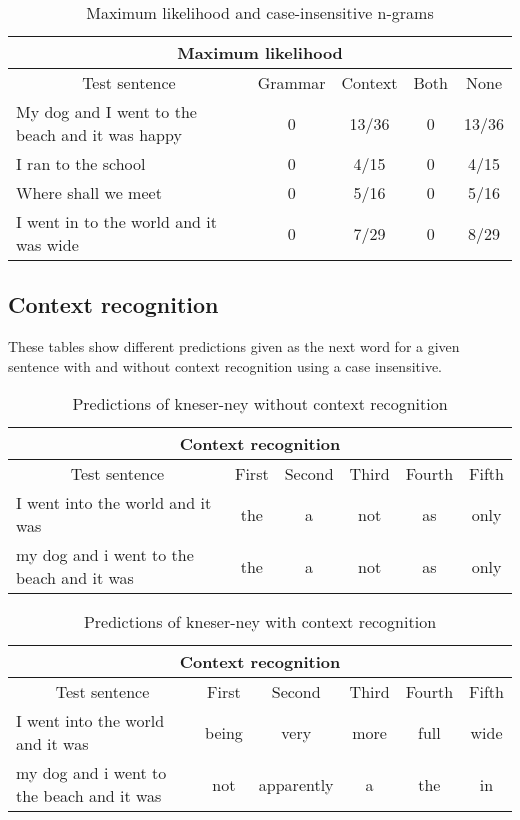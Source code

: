 \vspace{-1cm}
\begin{table}[H]
\centering
\caption{Maximum likelihood and case-insensitive n-grams}
{\scriptsize
\begin{tabular}{ |p{}|c|c|c|c| }
	\hline
	\multicolumn{5}{|c|}{Maximum likelihood} \\
	\hline
	\multicolumn{1}{|c|}{Test sentence} & Grammar & Context & Both & None \\
	\hline
	My dog and I went to the beach and it was happy & 0 & 13/36 & 0 &13/36 \\
	\hline
	I ran to the school & 0 & 4/15 & 0 & 4/15 \\
	\hline
	Where shall we meet & 0 & 5/16 & 0 & 5/16 \\
	\hline
	I went in to the world and it was wide & 0 & 7/29 & 0 & 8/29 \\
	\hline
\end{tabular}
}
\end{table}

\subsection{Context recognition}
These tables show different predictions given as the next word for a given sentence with and without context recognition using a case insensitive.

\vspace{-0.5cm}
\begin{table}[H]
\centering
\caption{Predictions of kneser-ney without context recognition}
{\scriptsize
\begin{tabular}{ |p{}|c|c|c|c|c| }
	\hline
	\multicolumn{6}{|c|}{Context recognition} \\
	\hline
	\multicolumn{1}{|c|}{Test sentence} & First & Second & Third & Fourth & Fifth\\
	\hline
	I went into the world and it was & the & a & not & as & only \\
	\hline
	my dog and i went to the beach and it was & the & a & not & as & only \\
	\hline
\end{tabular}
}
\end{table}

\vspace{-1cm}
\begin{table}[H]
\centering
\caption{Predictions of kneser-ney with context recognition}
{\scriptsize
\begin{tabular}{ |p{}|c|c|c|c|c| }
	\hline
	\multicolumn{6}{|c|}{Context recognition} \\
	\hline
	\multicolumn{1}{|c|}{Test sentence} & First & Second & Third & Fourth & Fifth\\
	\hline
	I went into the world and it was & being & very & more & full & wide \\
	\hline
	my dog and i went to the beach and it was & not & apparently & a & the & in \\
	\hline
\end{tabular}
}
\end{table}

